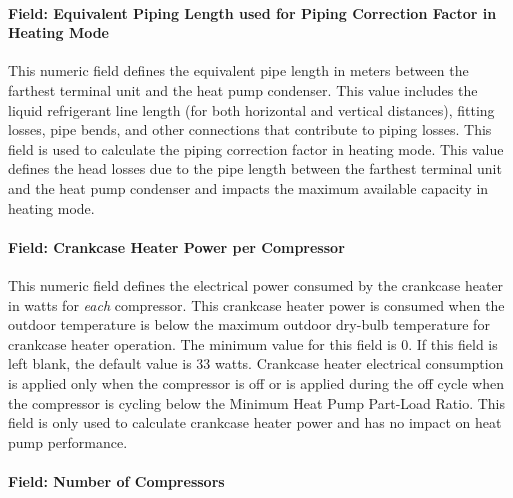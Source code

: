 \paragraph{Field: Equivalent Piping Length used for Piping Correction Factor in Heating Mode}\label{field-equivalent-piping-length-used-for-piping-correction-factor-in-heating-mode}

This numeric field defines the equivalent pipe length in meters between the farthest terminal unit and the heat pump condenser. This value includes the liquid refrigerant line length (for both horizontal and vertical distances), fitting losses, pipe bends, and other connections that contribute to piping losses. This field is used to calculate the piping correction factor in heating mode. This value defines the head losses due to the pipe length between the farthest terminal unit and the heat pump condenser and impacts the maximum available capacity in heating mode.

\paragraph{Field: Crankcase Heater Power per Compressor}\label{field-crankcase-heater-power-per-compressor}

This numeric field defines the electrical power consumed by the crankcase heater in watts for \emph{each} compressor. This crankcase heater power is consumed when the outdoor temperature is below the maximum outdoor dry-bulb temperature for crankcase heater operation. The minimum value for this field is 0. If this field is left blank, the default value is 33 watts. Crankcase heater electrical consumption is applied only when the compressor is off or is applied during the off cycle when the compressor is cycling below the Minimum Heat Pump Part-Load Ratio. This field is only used to calculate crankcase heater power and has no impact on heat pump performance.

\paragraph{Field: Number of Compressors}\label{field-number-of-compressors}

